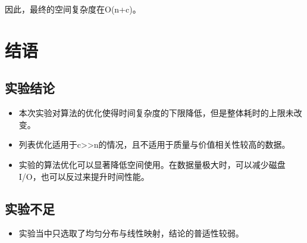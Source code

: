 \documentclass[openany]{book}
\begin{document}
因此，最终的空间复杂度在O(n+c)。

\chapter{结语}
\section{实验结论}
\begin{itemize}
    \item 本次实验对算法的优化使得时间复杂度的下限降低，但是整体耗时的上限未改变。
    \item 列表优化适用于c>>n的情况，且不适用于质量与价值相关性较高的数据。
    \item 实验的算法优化可以显著降低空间使用。在数据量极大时，可以减少磁盘I/O，也可以反过来提升时间性能。
\end{itemize}

\section{实验不足}
\begin{itemize}
    \item 实验当中只选取了均匀分布与线性映射，结论的普适性较弱。
\end{itemize}
\end{document}
